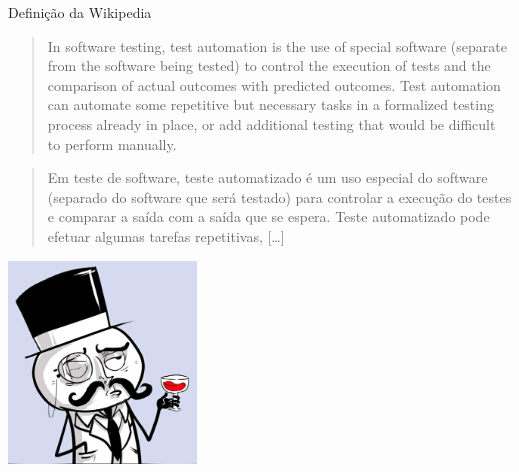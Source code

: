 \begin{frame}
  \begin{center}
    \Huge Definição da Wikipedia
  \end{center}
\end{frame}

\begin{frame}{\subsecname}
  \blockquote[{\cite[Wikipedia]{_test_2014}}]{
    In software testing, test automation is the use of special software
    (separate from the software being tested) to control the execution of
    tests and the comparison of actual outcomes with predicted outcomes. Test
    automation can automate some repetitive but necessary tasks in a
    formalized testing process already in place, or add additional testing
    that would be difficult to perform manually.
  }
\end{frame}

\begin{frame}{\subsecname}
  \blockquote[{\cite[Wikipedia]{_test_2014}}]{
    Em teste de software, teste automatizado é um uso especial do software
    (separado do software que será testado) para controlar a execução do testes
    e comparar a saída com a saída que se espera. Teste automatizado pode
    efetuar algumas tarefas repetitivas, [\ldots]
  }
\end{frame}

\begin{frame}{}
  \begin{center}
    \includegraphics[width=5cm]{images/like-a-sir}
  \end{center}
\end{frame}
